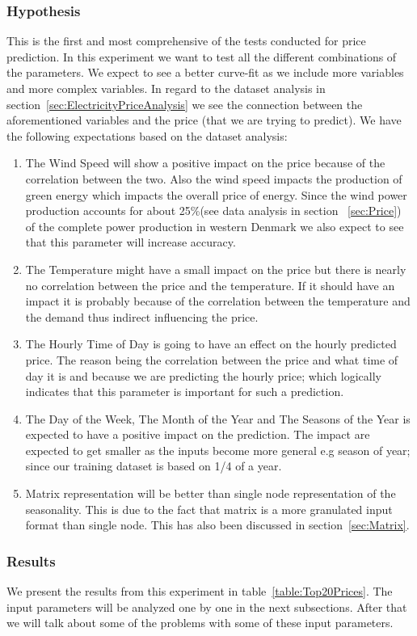 \subsubsection{Hypothesis}
This is the first and most comprehensive of the tests conducted for price prediction. In this experiment we want to test all the different combinations of the parameters. We expect to see a better curve-fit as we include more variables and more complex variables. In regard to the dataset analysis in section~\ref{sec:ElectricityPriceAnalysis} we see the connection between the aforementioned variables and the price (that we are trying to predict). We have the following expectations based on the dataset analysis:
\begin{enumerate}
	\item The Wind Speed will show a positive impact on the price because of the correlation between the two. Also the wind speed impacts the production of green energy which impacts the overall price of energy. Since the wind power production accounts for about 25\%(see data analysis in section ~\ref{sec:Price}) of the complete power production in western Denmark we also expect to see that this parameter will increase accuracy.
	\item The Temperature might have a small impact on the price but there is nearly no correlation between the price and the temperature. If it should have an impact it is probably because of the correlation between the temperature and the demand thus indirect influencing the price.
	\item The Hourly Time of Day is going to have an effect on the hourly predicted price. The reason being the correlation between the price and what time of day it is and because we are predicting the hourly price; which logically indicates that this parameter is important for such a prediction. 
	\item The Day of the Week, The Month of the Year and The Seasons of the Year is expected to have a positive impact on the prediction. The impact are expected to get smaller as the inputs become more general e.g season of year; since our training dataset is based on 1/4 of a year. 
	\item Matrix representation will be better than single node representation of the seasonality. This is due to the fact that matrix is a more granulated input format than single node. This has also been discussed in section~\ref{sec:Matrix}.
\end{enumerate}

\subsubsection{Results}
We present the results from this experiment in table~\ref{table:Top20Prices}. The input parameters will be analyzed one by one in the next subsections. After that we will talk about some of the problems with some of these input parameters.

